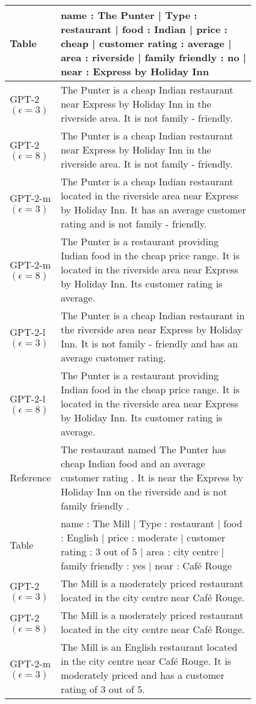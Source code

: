 \begin{table}[h]
\centering
\renewcommand{\arraystretch}{1.2}
\footnotesize
\begin{tabular}{l | p{0.8\linewidth}}
\toprule
Table & name : The Punter | Type : restaurant | food : Indian | price : cheap | customer rating : average | area : riverside | family friendly : no | near : Express by Holiday Inn  \\
 \hline
GPT-2 $(\epsilon=3)$ & The Punter is a cheap Indian restaurant near Express by Holiday Inn in the riverside area. It is not family - friendly. \\
GPT-2 $(\epsilon=8)$ & The Punter is a cheap Indian restaurant near Express by Holiday Inn in the riverside area. It is not family - friendly. \\
GPT-2-m $(\epsilon=3)$ & The Punter is a cheap Indian restaurant located in the riverside area near Express by Holiday Inn. It has an average customer rating and is not family - friendly. \\
GPT-2-m $(\epsilon=8)$ & The Punter is a restaurant providing Indian food in the cheap price range. It is located in the riverside area near Express by Holiday Inn. Its customer rating is average. \\
GPT-2-l $(\epsilon=3)$ & The Punter is a cheap Indian restaurant in the riverside area near Express by Holiday Inn. It is not family - friendly and has an average customer rating. \\
GPT-2-l $(\epsilon=8)$ & The Punter is a restaurant providing Indian food in the cheap price range. It is located in the riverside area near Express by Holiday Inn. Its customer rating is average. \\
\hline
 Reference & The restaurant named The Punter has cheap Indian food and an average customer rating . It is near the Express by Holiday Inn on the riverside and is not family friendly . \\
\midrule\midrule
Table & name : The Mill | Type : restaurant | food : English | price : moderate | customer rating : 3 out of 5 | area : city centre | family friendly : yes | near : Café Rouge  \\
 \hline
GPT-2 $(\epsilon=3)$ & The Mill is a moderately priced restaurant located in the city centre near Café Rouge. \\
GPT-2 $(\epsilon=8)$ & The Mill is a moderately priced restaurant located in the city centre near Café Rouge. \\
GPT-2-m $(\epsilon=3)$ & The Mill is an English restaurant located in the city centre near Café Rouge. It is moderately priced and has a customer rating of 3 out of 5. \\

\end{tabular}
\end{table}
